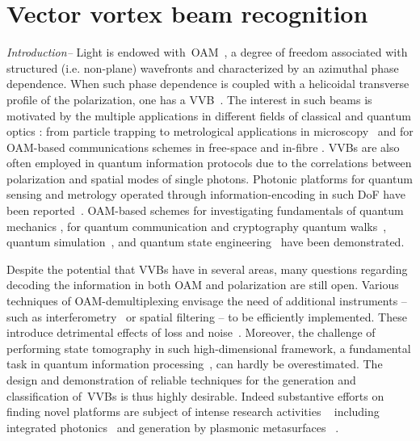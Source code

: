 
\chapter{Vector vortex beam recognition}
\label{Section:ML_VVBs}


\textit{Introduction--} Light is endowed with~\ac{OAM}~\cite{allen_0AM_1992,padgett2004light}, a degree of freedom associated with structured (i.e. non-plane) wavefronts and characterized by an azimuthal phase dependence. 
When such phase dependence is coupled with a helicoidal transverse profile of the polarization, one has a \ac{VVB}~\cite{erhard2018twisted, Miles}.
The interest in such beams is motivated by the multiple applications in different fields of classical and quantum optics \cite{Marrucci2011Rev}: from particle trapping to metrological applications in microscopy~\cite{Cardano2015Rev, roadMap} and for OAM-based communications schemes in free-space and in-fibre \cite{Willner:15,cozzolino2019air}.
\acp{VVB} are also often employed in quantum information protocols due to the correlations between polarization and spatial modes of single photons. Photonic platforms for quantum sensing and metrology operated through information-encoding in such DoF have been reported~\cite{fickler2012quantum,dambrosio_gear2013}. OAM-based schemes for investigating fundamentals of quantum mechanics \cite{Goswami2018}, for quantum communication and cryptography \cite{vallone_qkd_2014,Wang2015,Mirhosseini_2015,Malik2016,Sit17,Cozzolino2019_fiber} quantum walks~\cite{zhang-oam-qw-2010,goyal2013implementing,cardano2015quantum}, quantum simulation~\cite{cardano2016statistical,cardano_zak_2017}, and quantum state engineering~\cite{Innocenti2017,giordani_2018} have been demonstrated. 

Despite the potential that \acp{VVB} have in several areas, many questions regarding decoding the information in both OAM and polarization are still open. Various techniques of OAM-demultiplexing envisage the need of additional instruments -- such as interferometry~\cite{Leach2002_oamSorter,Slussarenko2010_oamSorter,Bauer2014} or spatial filtering \cite{Berkhout2010_oamSorter,bolduc2013holo,Mehul2014_oamSorter}
-- to be efficiently implemented. These introduce detrimental effects of loss and noise~\cite{Qassim2014}. Moreover, the challenge of performing state tomography in such high-dimensional framework, a fundamental task in quantum information processing~\cite{Paris2004,
Banaszek_2013}, can hardly be overestimated. The design and demonstration of reliable techniques for the generation and classification of~\acp{VVB} is thus highly desirable. Indeed 
substantive efforts on finding novel platforms are subject of intense research activities   ~\cite{Liu:17,Ndagano:18, Cardano2015Rev,roadMap} 
including integrated photonics~\cite{ oamchip,cai2012integrated,chiptofiber} and generation by plasmonic metasurfaces~\cite{karimi2014,yue2016} 
.


